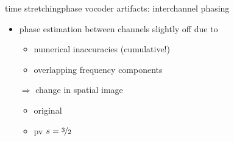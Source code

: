 	\begin{frame}{time stretching}{phase vocoder artifacts: interchannel phasing}
        \begin{itemize}
            \item   phase estimation between channels slightly off due to
                \begin{itemize}
                    \item   numerical inaccuracies (cumulative!)
                    \item   overlapping frequency components
                \end{itemize}
                \pause
                \bigskip
            \item[$\Rightarrow$] change in spatial image
                \begin{itemize}
                            \item   {}\; original  
                            \item   {}\; pv $s = \nicefrac{3}{2}$ 
                \end{itemize}
        \end{itemize}
	\end{frame}

